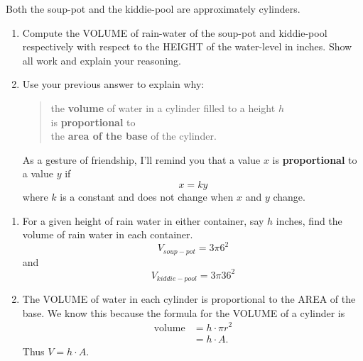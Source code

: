 \documentclass[nooutcomes,noauthor,hints,handout,12pt]{ximera}
\begin{document}
\begin{question}
  Both the soup-pot and the kiddie-pool are approximately cylinders.
  \begin{enumerate}
  \item Compute the VOLUME of rain-water of the soup-pot and
    kiddie-pool respectively with respect to the HEIGHT of the
    water-level in inches. Show all work and explain your reasoning.
  \item Use your previous answer to explain why:
    \begin{quote}
      the \textbf{volume} of water in a cylinder filled to a height $h$ \\ \quad is
      \textbf{proportional} to \\
      \quad\quad the \textbf{area of the base} of the cylinder.
    \end{quote}
    As a gesture of friendship, I'll remind you that a value $x$ is
    \textbf{proportional} to a value $y$ if
  \[
  x = k y
  \]
  where $k$ is a constant and does not change when $x$ and $y$ change.
  \end{enumerate}
  \begin{freeResponse}
    \begin{enumerate}
      \item For a given height of rain water in either container, say
        $h$ inches, find the volume of rain water in each container.
        \[
        V_{soup-pot} = 3 \pi 6^2
        \]
        and
        \[
        V_{kiddie-pool} = 3 \pi 36^2 
        \]
      \item The VOLUME of water in each cylinder is proportional to
        the AREA of the base. We know this because the formula for the
        VOLUME of a cylinder is
        \begin{align*}
          \text{volume} &= h \cdot \pi r^2\\
          &= h \cdot A.
        \end{align*}
        Thus $V = h\cdot A$.
    \end{enumerate}
  \end{freeResponse}
\end{question}
\mynewpage
\end{document}
